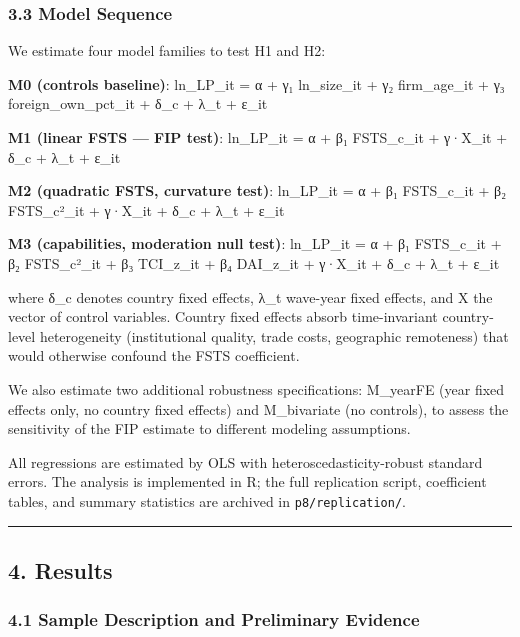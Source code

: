 \documentclass[12pt,a4paper]{article}
\begin{document}
\hypertarget{33-model-sequence}{%
\subsubsection{3.3 Model Sequence}\label{33-model-sequence}}

We estimate four model families to test H1 and H2:

\textbf{M0 (controls baseline)}: ln\_LP\_it = α + γ₁ ln\_size\_it + γ₂
firm\_age\_it + γ₃ foreign\_own\_pct\_it + δ\_c + λ\_t + ε\_it

\textbf{M1 (linear FSTS --- FIP test)}: ln\_LP\_it = α + β₁ FSTS\_c\_it
+ γ·X\_it + δ\_c + λ\_t + ε\_it

\textbf{M2 (quadratic FSTS, curvature test)}: ln\_LP\_it = α + β₁
FSTS\_c\_it + β₂ FSTS\_c²\_it + γ·X\_it + δ\_c + λ\_t + ε\_it

\textbf{M3 (capabilities, moderation null test)}: ln\_LP\_it = α + β₁
FSTS\_c\_it + β₂ FSTS\_c²\_it + β₃ TCI\_z\_it + β₄ DAI\_z\_it + γ·X\_it
+ δ\_c + λ\_t + ε\_it

where δ\_c denotes country fixed effects, λ\_t wave-year fixed effects,
and X the vector of control variables. Country fixed effects absorb
time-invariant country-level heterogeneity (institutional quality, trade
costs, geographic remoteness) that would otherwise confound the FSTS
coefficient.

We also estimate two additional robustness specifications: M\_yearFE
(year fixed effects only, no country fixed effects) and M\_bivariate (no
controls), to assess the sensitivity of the FIP estimate to different
modeling assumptions.

All regressions are estimated by OLS with heteroscedasticity-robust
standard errors. The analysis is implemented in R; the full replication
script, coefficient tables, and summary statistics are archived in
\texttt{p8/replication/}.

\begin{center}\rule{0.5\linewidth}{0.5pt}\end{center}

\hypertarget{4-results}{%
\subsection{4. Results}\label{4-results}}

\hypertarget{41-sample-description-and-preliminary-evidence}{%
\subsubsection{4.1 Sample Description and Preliminary
Evidence}\label{41-sample-description-and-preliminary-evidence}}
\end{document}
